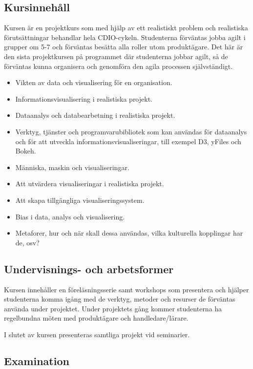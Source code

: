 \subsection*{Kursinnehåll}

Kursen är en projektkurs som med hjälp av ett realistiskt problem och
realistiska förutsättningar behandlar hela CDIO-cykeln. Studenterna
förväntas jobba agilt i grupper om 5-7 och förväntas besätta alla roller
utom produktägare. Det här är den sista projektkursen på programmet där
studenterna jobbar agilt, så de förväntas kunna organisera och genomföra
den agila processen självständigt.

\begin{itemize}
\tightlist
\item
  Vikten av data och visualisering för en organisation.
\item
  Informationsvisualisering i realistiska projekt.
\item
  Dataanalys och databearbetning i realistiska projekt.
\item
  Verktyg, tjänster och programvarubibliotek som kan användas för
  dataanalys och för att utveckla informationsvisualiseringar, till
  exempel D3, yFiles och Bokeh.
\item
  Människa, maskin och visualiseringar.
\item
  Att utvärdera visualiseringar i realistiska projekt.
\item
  Att skapa tillgängliga visualiseringssystem.
\item
  Bias i data, analys och visualisering.
\item
  Metaforer, hur och när skall dessa användas, vilka kulturella
  kopplingar har de, osv?
\end{itemize}

\subsection*{Undervisnings- och
arbetsformer}

Kursen innehåller en föreläsningsserie samt workshops som presentera och
hjälper studenterna komma igång med de verktyg, metoder och resurser de
förväntas använda under projektet. Under projektets gång kommer
studenterna ha regelbundna möten med produktägare och handledare/lärare.

I slutet av kursen presenteras samtliga projekt vid seminarier.

\subsection*{Examination}

